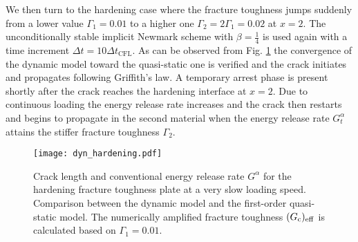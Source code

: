 We then turn to the hardening case where the fracture toughness jumps suddenly from a lower value $\Gamma_1=0.01$ to a higher one $\Gamma_2=2\Gamma_1=0.02$ at $x=2$. The unconditionally stable implicit Newmark scheme with $\beta=\frac{1}{4}$ is used again with a time increment $\Delta t=10\Delta t_\mathrm{CFL}$. As can be observed from Fig. \ref{fig:hardGcqs} the convergence of the dynamic model toward the quasi-static one is verified and the crack initiates and propagates following Griffith's law. A temporary arrest phase is present shortly after the crack reaches the hardening interface at $x=2$. Due to continuous loading the energy release rate increases and the crack then restarts and begins to propagate in the second material when the energy release rate $G^\alpha_t$ attains the stiffer fracture toughness $\Gamma_2$.
\begin{figure}[htbp]
\centering
\texttt{[image: dyn\_hardening.pdf]}
\caption{Crack length and conventional energy release rate $G^\alpha$ for the hardening fracture toughness plate at a very slow loading speed. Comparison between the dynamic model and the first-order quasi-static model. The numerically amplified fracture toughness $(G_\mathrm{c})_\mathrm{eff}$ is calculated based on $\Gamma_1=0.01$.} \label{fig:hardGcqs}
\end{figure}

